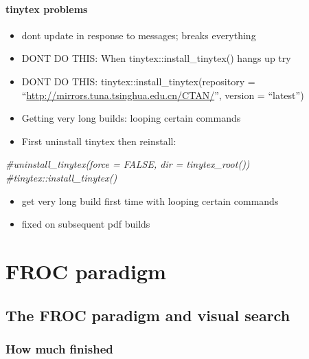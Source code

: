 \documentclass[
]{book}
\newenvironment{Shaded}{\begin{snugshade}}{\end{snugshade}}
\newcommand{\CommentTok}[1]{\textcolor[rgb]{0.56,0.35,0.01}{\textit{#1}}}
\providecommand{\tightlist}{%
  \setlength{\itemsep}{0pt}\setlength{\parskip}{0pt}}
\begin{document}
\hypertarget{tinytex-problems}{%
\subsection{tinytex problems}\label{tinytex-problems}}

\begin{itemize}
\tightlist
\item
  dont update in response to messages; breaks everything
\item
  DONT DO THIS: When tinytex::install\_tinytex() hangs up try
\item
  DONT DO THIS: tinytex::install\_tinytex(repository = ``\url{http://mirrors.tuna.tsinghua.edu.cn/CTAN/}'', version = ``latest'')
\item
  Getting very long builds: looping certain commands
\item
  First uninstall tinytex then reinstall:
\end{itemize}

\begin{Shaded}
\begin{Highlighting}[]
\CommentTok{#uninstall_tinytex(force = FALSE, dir = tinytex_root())}
\CommentTok{#tinytex::install_tinytex()}
\end{Highlighting}
\end{Shaded}

\begin{itemize}
\tightlist
\item
  get very long build first time with looping certain commands
\item
  fixed on subsequent pdf builds
\end{itemize}

\hypertarget{part-froc-paradigm}{%
\part*{FROC paradigm}\label{part-froc-paradigm}}

\hypertarget{froc-paradigm}{%
\chapter{The FROC paradigm and visual search}\label{froc-paradigm}}

\hypertarget{froc-paradigm-how-much-finished}{%
\section{How much finished}\label{froc-paradigm-how-much-finished}}
\end{document}
